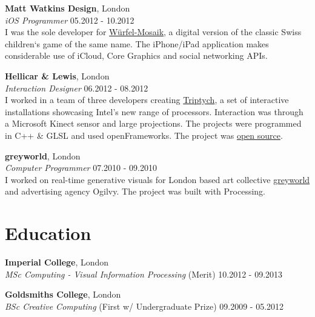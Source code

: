 \documentclass[margin,line,a4paper]{resume}
\begin{document}
\begin{resume}
\textbf{Matt Watkins Design}, London \vspace{1mm}\\
\textsl{iOS Programmer} \hfill 05.2012 - 10.2012 \vspace{2mm} \\
I was the sole developer for
\href{http://wurfelmosaik.com/}{W\"{u}rfel-Mosaik}, a digital version
of the classic Swiss children`s game of the same name. The iPhone/iPad
application makes considerable use of iCloud, Core Graphics and social
networking APIs.

\textbf{Hellicar \& Lewis}, London \vspace{1mm}\\
\textsl{Interaction Designer} \hfill 06.2012 - 08.2012 \vspace{2mm} \\
I worked in a team of three developers creating
\href{http://www.hellicarandlewis.com/intel/}{Triptych},
a set of interactive installations showcasing Intel's new range of
processors. Interaction was through a Microsoft Kinect sensor and
large projections. The projects were programmed in C++ \& GLSL and
used openFrameworks. The project was
\href{https://github.com/HellicarAndLewis/Triptych}{open source}.

\textbf{greyworld}, London  \vspace{1mm}\\
\textsl{Computer Programmer} \hfill 07.2010 - 09.2010 \vspace{2mm} \\
I worked on real-time generative visuals for London
based art collective \href{http://greyworld.org}{greyworld} and
advertising agency Ogilvy. The project was built with Processing.


\section{\mysidestyle Education}

\textbf{Imperial College}, London \vspace{0.5mm}\\
\textsl{MSc Computing - Visual Information Processing} (Merit) \hfill 10.2012 - 09.2013 \vspace{1mm}

\textbf{Goldsmiths College}, London \vspace{0.5mm}\\
\textsl{BSc Creative Computing} (First w/ Undergraduate Prize) \hfill 09.2009 - 05.2012 \vspace{1mm}


\end{resume}
\end{document}
